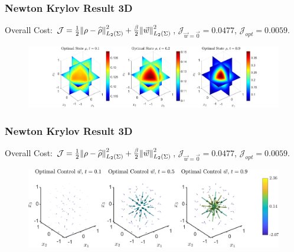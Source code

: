 \documentclass[aspectratio=169,xcolor=dvipsnames]{beamer}
\begin{document}
\begin{frame}
	\frametitle{Newton Krylov Result 3D}
	\vspace{0.3cm}
	Overall Cost: $\mathcal J = \frac{1}{2}\norm{\rho- \widehat{\rho}}_{L_2(\Sigma)}^2 + \frac{\beta}{2} \norm{\vec{w}}_{L_2(\Sigma)}^2$, $\mathcal J_{\vec{w} = \vec 0} = 0.0477$, $\mathcal J_{opt} = 0.0059$.
	\vspace{0.3cm}
	\begin{figure}
		\includegraphics[width=15cm]{rhokn1.png}
	\end{figure}
	
\end{frame}
\begin{frame}
	\frametitle{Newton Krylov Result 3D}
	\vspace{0.3cm}
	Overall Cost: $\mathcal J = \frac{1}{2}\norm{\rho- \widehat{\rho}}_{L_2(\Sigma)}^2 + \frac{\beta}{2} \norm{\vec{w}}_{L_2(\Sigma)}^2$, $\mathcal J_{\vec{w} = \vec 0} = 0.0477$, $\mathcal J_{opt} = 0.0059$.
	\vspace{0.3cm}
	\begin{figure}
		\includegraphics[width=13cm]{Controlkn1.png}
	\end{figure}
	
\end{frame}
\end{document}
